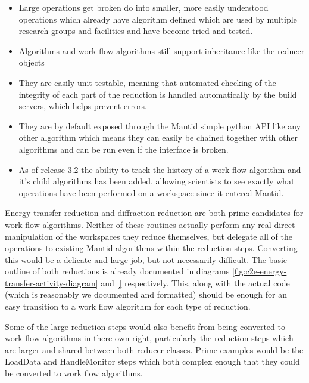 \documentclass[paper=a4, fontsize=11pt]{scrartcl}	%
\numberwithin{equation}{section}															%
\numberwithin{figure}{section}																%
\numberwithin{table}{section}																%
\begin{document}
\begin{itemize}
\item Large operations get broken do into smaller, more easily understood operations which already have algorithm defined which are used by multiple research groups and facilities and have become tried and tested.

\item Algorithms and work flow algorithms still support inheritance like the reducer objects

\item They are easily unit testable, meaning that automated checking of the integrity of each part of the reduction is handled automatically by the build servers, which helps prevent errors.

\item They are by default exposed through the Mantid simple python API like any other algorithm which means they can easily be chained together with other algorithms and can be run even if the interface is broken.

\item As of release 3.2 the ability to track the history of a work flow algorithm and it's child algorithms has been added, allowing scientists to see exactly what operations have been performed on a workspace since it entered Mantid.
\end{itemize}

Energy transfer reduction and diffraction reduction are both prime candidates for work flow algorithms. Neither of these routines actually perform any real direct manipulation of the workspaces they reduce themselves, but delegate all of the operations to existing Mantid algorithms within the reduction steps. Converting this would be a delicate and large job, but not necessarily difficult. The basic outline of both reductions is already documented in diagrams \ref{fig:c2e-energy-transfer-activity-diagram} and \ref{} respectively. This, along with the actual code (which is reasonably we documented and formatted) should be enough for an easy transition to a work flow algorithm for each type of reduction.

Some of the large reduction steps would also benefit from being converted to work flow algorithms in there own right, particularly the reduction steps which are larger and shared between both reducer classes. Prime examples would be the LoadData and HandleMonitor steps which both complex enough that they could be converted to work flow algorithms.
\end{document}
